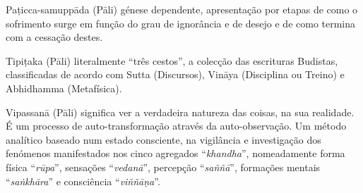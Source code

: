 \begin{glossarydescription}





\item[Paṭicca-samuppāda] (Pāli) génese dependente, apresentação por etapas de
  como o sofrimento surge em função do grau de ignorância e de desejo e de
  como termina com a cessação destes.





\item[Tipiṭaka] (Pāli) literalmente “três cestos”, a colecção das escrituras
  Budistas, classificadas de acordo com Sutta (Discursos), Vināya (Disciplina ou
  Treino) e Abhidhamma (Metafísica).



\item[Vipassanā] (Pāli) significa ver a verdadeira natureza das coisas, na sua
  realidade. É um processo de auto-transformação através da auto-observação. Um
  método analítico baseado num estado consciente, na vigilância e investigação dos
  fenómenos manifestados nos cinco agregados “\emph{khandha}”, nomeadamente
  forma física “\emph{rūpa}”, sensações “\emph{vedanā}”,
  percepção “\emph{saññā}”, formações mentais “\emph{saṅkhāra}” e consciência
  “\emph{viññāṇa}”.


\end{glossarydescription}

